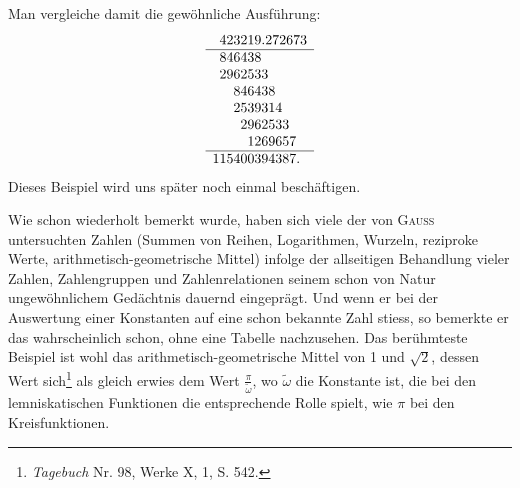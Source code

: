 \clearpage{}
\setcounter{footnote}{0}
\noindent Man vergleiche damit die gewöhnliche Ausführung:
\[
\begin{array}{l}
\hphantom{0}423219\mathord{.}272673\\\hline
\hphantom{0}846438\\
\hphantom{0}2962533\\
\hphantom{000}846438\\
\hphantom{000}2539314\\
\hphantom{0000}2962533\\
\hphantom{00000}1269657\\\hline
115400394387.
\end{array}
\]
\noindent Dieses Beispiel wird uns später noch einmal beschäftigen.

Wie schon wiederholt bemerkt wurde, haben sich viele der von \textsc{Gauss}
untersuchten Zahlen (Summen von Reihen, Logarithmen, Wurzeln, reziproke
Werte, arithmetisch-geometrische Mittel) infolge der allseitigen Behandlung
vieler Zahlen, Zahlengruppen und Zahlenrelationen seinem schon von Natur
ungewöhnlichem Gedächtnis dauernd eingeprägt. Und wenn er bei der Auswertung einer Konstanten auf eine schon bekannte Zahl stiess, so bemerkte
er das wahrscheinlich schon, ohne eine Tabelle nachzusehen. Das berühmteste
Beispiel ist wohl das arithmetisch-geometrische Mittel von 1 und $\sqrt{2}$, dessen
Wert sich\footnote{\textit{Tagebuch} Nr. 98, Werke X, 1, S. 542.} als gleich erwies dem Wert $\frac{\pi}{\tilde{\omega}}$, wo $\tilde{\omega}$ die Konstante ist, die bei
den lemniskatischen Funktionen die entsprechende Rolle spielt, wie $\pi$ bei den
Kreisfunktionen.
\clearpage\endgroup
